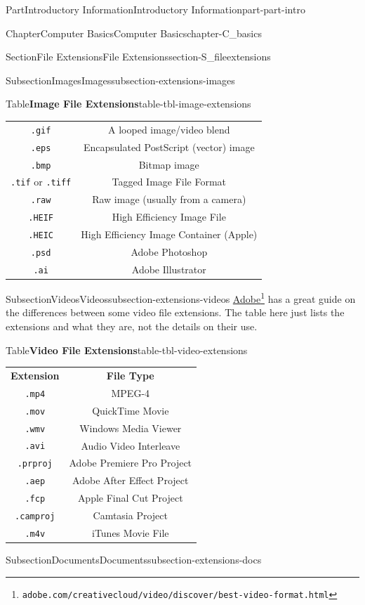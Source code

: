\documentclass[twoside,10pt,]{book}
\newcommand{\tabularfont}{\relax}
\newcommand{\mono}[1]{\texttt{#1}}
\begin{document}
\begin{partptx}{Part}{Introductory Information}{}{Introductory Information}{}{}{part-part-intro}
\begin{chapterptx}{Chapter}{Computer Basics}{}{Computer Basics}{}{}{chapter-C_basics}
\begin{sectionptx}{Section}{File Extensions}{}{File Extensions}{}{}{section-S_fileextensions}
\begin{subsectionptx}{Subsection}{Images}{}{Images}{}{}{subsection-extensions-images}
\begin{tableptx}{Table}{\textbf{Image File Extensions}}{table-tbl-image-extensions}{}
{\begin{tabular}{cc}
\mono{.gif}&A looped image\slash{}video blend\tabularnewline[0pt]
\mono{.eps}&Encapsulated PostScript (vector) image\tabularnewline[0pt]
\mono{.bmp}&Bitmap image\tabularnewline[0pt]
\mono{.tif} or \mono{.tiff}&Tagged Image File Format\tabularnewline[0pt]
\mono{.raw}&Raw image (usually from a camera)\tabularnewline[0pt]
\mono{.HEIF}&High Efficiency Image File\tabularnewline[0pt]
\mono{.HEIC}&High Efficiency Image Container (Apple)\tabularnewline[0pt]
\mono{.psd}&Adobe Photoshop\tabularnewline[0pt]
\mono{.ai}&Adobe Illustrator
\end{tabular}
}%
\end{tableptx}%
\end{subsectionptx}
%
%
\typeout{************************************************}
\typeout{************************************************}
%
\begin{subsectionptx}{Subsection}{Videos}{}{Videos}{}{}{subsection-extensions-videos}
%
\href{https://www.adobe.com/creativecloud/video/discover/best-video-format.html}{Adobe}\footnote{\nolinkurl{adobe.com/creativecloud/video/discover/best-video-format.html}\label{fn-extensions-videos-c-b}} has a great guide on the differences between some video file extensions. The table here just lists the extensions and what they are, not the details on their use.%
\begin{tableptx}{Table}{\textbf{Video File Extensions}}{table-tbl-video-extensions}{}%
\centering%
{\tabularfont%
\begin{tabular}{cc}
{\bfseries{}Extension}&{\bfseries{}File Type}\tabularnewline[0pt]
\mono{.mp4}&MPEG-4\tabularnewline[0pt]
\mono{.mov}&QuickTime Movie\tabularnewline[0pt]
\mono{.wmv}&Windows Media Viewer\tabularnewline[0pt]
\mono{.avi}&Audio Video Interleave\tabularnewline[0pt]
\mono{.prproj}&Adobe Premiere Pro Project\tabularnewline[0pt]
\mono{.aep}&Adobe After Effect Project\tabularnewline[0pt]
\mono{.fcp}&Apple Final Cut Project\tabularnewline[0pt]
\mono{.camproj}&Camtasia Project\tabularnewline[0pt]
\mono{.m4v}&iTunes Movie File
\end{tabular}
}%
\end{tableptx}%
\end{subsectionptx}
%
%
\typeout{************************************************}
\typeout{************************************************}
%
\begin{subsectionptx}{Subsection}{Documents}{}{Documents}{}{}{subsection-extensions-docs}
%

\end{subsectionptx}
\end{sectionptx}
\end{chapterptx}
\end{partptx}
\end{document}
